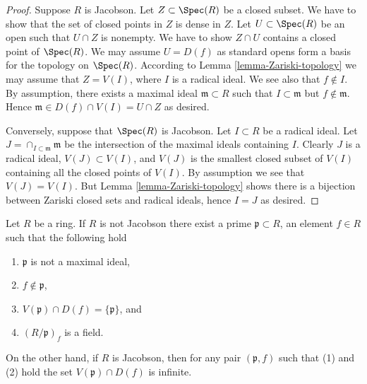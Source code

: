 \begin{proof}
Suppose $R$ is Jacobson. Let $Z \subset \Spec(R)$
be a closed subset. We have to show that the set of closed
points in $Z$ is dense in $Z$. Let $U \subset \Spec(R)$
be an open such that $U \cap Z$ is nonempty.
We have to show $Z \cap U$ contains a closed point
of $\Spec(R)$. We may
assume $U = D(f)$ as standard opens form a basis for the
topology on $\Spec(R)$. According to
Lemma \ref{lemma-Zariski-topology} we may assume that
$Z = V(I)$, where $I$ is a radical ideal. We see also
that $f \not \in I$. By assumption, there exists a
maximal ideal $\mathfrak m \subset R$ such that
$I \subset \mathfrak m$ but $f \not\in \mathfrak m$.
Hence $\mathfrak m \in D(f) \cap V(I) = U \cap Z$ as desired.

\medskip\noindent
Conversely, suppose that $\Spec(R)$ is Jacobson.
Let $I \subset R$ be a radical ideal. Let
$J = \cap_{I \subset \mathfrak m} \mathfrak m$
be the intersection of the maximal ideals containing $I$.
Clearly $J$ is a radical ideal, $V(J) \subset V(I)$, and
$V(J)$ is the smallest closed subset of $V(I)$ containing
all the closed points of $V(I)$. By assumption we see that
$V(J) = V(I)$. But Lemma \ref{lemma-Zariski-topology}
shows there is a bijection between Zariski closed
sets and radical ideals, hence $I = J$ as desired.
\end{proof}

\begin{lemma}
\label{lemma-characterize-jacobson}
Let $R$ be a ring. If $R$ is not Jacobson there exist
a prime $\mathfrak p \subset R$, an element $f \in R$
such that the following hold
\begin{enumerate}
\item $\mathfrak p$ is not a maximal ideal,
\item $f \not \in \mathfrak p$,
\item $V(\mathfrak p) \cap D(f) = \{\mathfrak p\}$, and
\item $(R/\mathfrak p)_f$ is a field.
\end{enumerate}
On the other hand, if $R$ is Jacobson, then for any pair $(\mathfrak p, f)$
such that (1) and (2) hold the set $V(\mathfrak p) \cap D(f)$ is
infinite.
\end{lemma}

